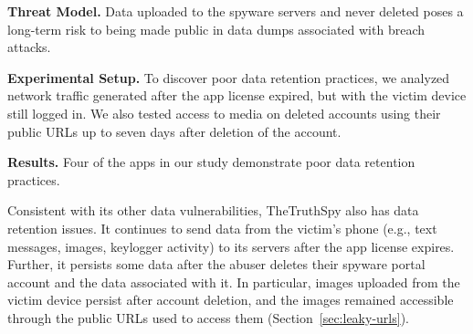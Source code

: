 \textbf{Threat Model.} Data uploaded to the spyware servers and never deleted poses a long-term risk to being made public in data dumps associated with breach attacks.

\textbf{Experimental Setup.}  To discover poor data retention practices, we analyzed network traffic generated after the app license expired, but with the victim device still logged in.  We also tested
access to media on deleted accounts using their public URLs up to
seven days after deletion of the account.


\textbf{Results.}  Four of the apps in our study demonstrate poor data retention practices.

Consistent with its other data vulnerabilities,
TheTruthSpy also has data retention issues.
It continues to send
data from the victim's phone (e.g., text messages, images, keylogger
activity) to its servers after the app license expires. Further, it persists some data after the abuser
deletes their spyware portal account and the data associated with it.
%
%
In particular, images uploaded from the victim device persist after
account deletion, and the images remained accessible through the
public URLs used to access them (Section~\ref{sec:leaky-urls}).


